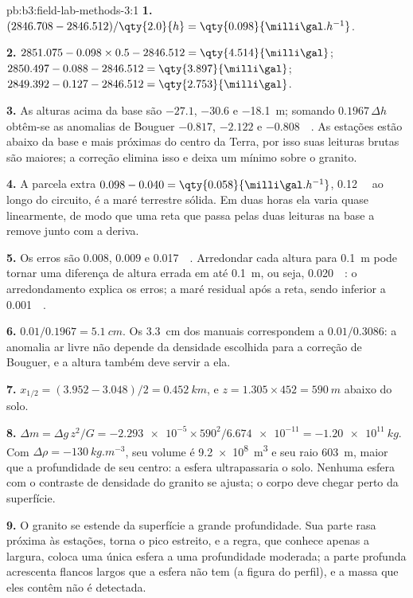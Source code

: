 \begin{solution}{pb:b3:field-lab-methods-3:1}
\textbf{1.} $(2846.708 - 2846.512)/\qty{2.0}{h} = \qty{0.098}{\milli\gal.h^{-1}}$.

\textbf{2.} $2851.075 - 0.098\times0.5 - 2846.512 = \qty{4.514}{\milli\gal}$;
$2850.497 - 0.088 - 2846.512 = \qty{3.897}{\milli\gal}$;
$2849.392 - 0.127 - 2846.512 = \qty{2.753}{\milli\gal}$.

\textbf{3.} As alturas acima da base são $-27.1$, $-30.6$ e
\qty{-18.1}{m}; somando $0.1967\,\Delta h$ obtêm-se as anomalias de Bouguer
$\num{-0.817}$, $\num{-2.122}$ e \qty{-0.808}{\milli\gal}. As
estações estão abaixo da base e mais próximas do centro da Terra,
por isso suas leituras brutas são maiores; a correção elimina isso e
deixa um mínimo sobre o granito.

\textbf{4.} A parcela extra $0.098 - 0.040 = \qty{0.058}{\milli\gal.h^{-1}}$,
\qty{0.12}{\milli\gal} ao longo do circuito, é a maré terrestre sólida. Em duas
horas ela varia quase linearmente, de modo que uma reta que passa pelas duas
leituras na base a remove junto com a deriva.

\textbf{5.} Os erros são $\num{0.008}$, $\num{0.009}$ e
\qty{0.017}{\milli\gal}. Arredondar cada altura para \qty{0.1}{m} pode tornar
uma diferença de altura errada em até \qty{0.1}{m}, ou seja,
\qty{0.020}{\milli\gal}: o arredondamento explica os erros; a maré
residual após a reta, sendo inferior a \qty{0.001}{\milli\gal}.

\textbf{6.} $0.01/0.1967 = \qty{5.1}{cm}$. Os \qty{3.3}{cm} dos manuais correspondem a
$0.01/0.3086$: a anomalia ar livre não depende da densidade
escolhida para a correção de Bouguer, e a altura também deve servir a ela.

\textbf{7.} $x_{1/2} = (3.952 - 3.048)/2 = \qty{0.452}{km}$, e $z = 1.305
\times452 = \qty{590}{m}$ abaixo do solo.

\textbf{8.} $\Delta m = \Delta g\,z^2/G = \num{-2.293e-5}\times590^2/
\num{6.674e-11} = \qty{-1.20e11}{kg}$. Com $\Delta\rho =
\qty{-130}{kg.m^{-3}}$, seu volume é \qty{9.2e8}{m^3} e seu raio
\qty{603}{m}, maior que a profundidade de seu centro: a esfera
ultrapassaria o solo. Nenhuma esfera com o contraste de densidade do granito
se ajusta; o corpo deve chegar perto da superfície.

\textbf{9.} O granito se estende da superfície a grande profundidade. Sua parte rasa
próxima às estações, torna o pico estreito, e a regra, que
conhece apenas a largura, coloca uma única esfera a uma profundidade moderada; a
parte profunda acrescenta flancos largos que a esfera não tem (a figura do
perfil), e a massa que eles contêm não é detectada.


\end{solution}
